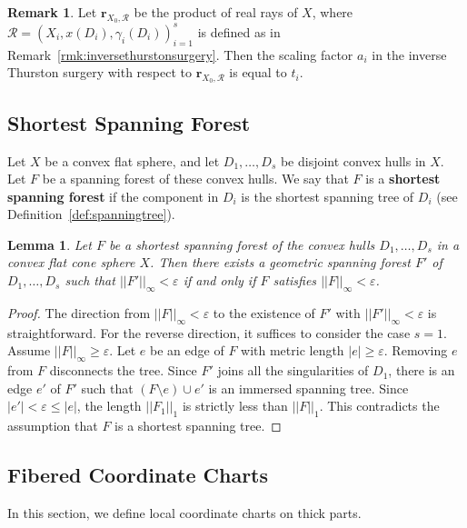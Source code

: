 \documentclass{compositio}
\numberwithin{equation}{section}
\numberwithin{figure}{section}
\theoremstyle{definition}
\newtheorem{remark}[definition]{Remark}
\theoremstyle{plain}
\newtheorem{lemma}[definition]{Lemma}
\begin{document}
{\begin{remark}\label{rmk:exactlyrescalingfactor}
    Let $\mathbf{r}_{X_0, \mathcal{R}}$ be the product of real rays of $X$, where $\mathcal{R} = (X_i, x(D_i), \gamma_i(D_i))_{i=1}^s$ is defined as in Remark~\ref{rmk:inversethurstonsurgery}. Then the scaling factor $a_i$ in the inverse Thurston surgery with respect to $\mathbf{r}_{X_0, \mathcal{R}}$ is equal to $t_i$.
\end{remark}

\subsection{Shortest Spanning Forest}

Let $X$ be a convex flat sphere, and let $D_1, \ldots, D_s$ be disjoint convex hulls in $X$. Let $F$ be a spanning forest of these convex hulls. We say that $F$ is a \textbf{shortest spanning forest} if the component in $D_i$ is the shortest spanning tree of $D_i$ (see Definition~\ref{def:spanningtree}). 

\begin{lemma}\label{lem:byshortestone}
Let $F$ be a shortest spanning forest of the convex hulls $D_1, \ldots, D_s$ in a convex flat cone sphere $X$. Then there exists a geometric spanning forest $F'$ of $D_1, \ldots, D_s$ such that $||F'||_\infty < \varepsilon$ if and only if $F$ satisfies $||F||_\infty < \varepsilon$.
\end{lemma}

\begin{proof}
The direction from $||F||_\infty < \varepsilon$ to the existence of $F'$ with $||F'||_\infty < \varepsilon$ is straightforward. For the reverse direction, it suffices to consider the case $s = 1$. Assume $||F||_\infty \geq \varepsilon$. Let $e$ be an edge of $F$ with metric length $|e| \geq \varepsilon$. Removing $e$ from $F$ disconnects the tree. Since $F'$ joins all  the singularities of $D_1$, there is an edge $e'$ of $F'$ such that $(F \setminus e)\cup e'$ is an immersed spanning tree. Since $|e'| < \varepsilon \leq |e|$, the length $||F_1||_1$ is strictly less than $||F||_1$. This contradicts the assumption that $F$ is a shortest spanning tree.
\end{proof}

\subsection{Fibered Coordinate Charts}\label{sec:fiberedcoordinatechart}
In this section, we define local coordinate charts on thick parts. 

}
\end{document}
